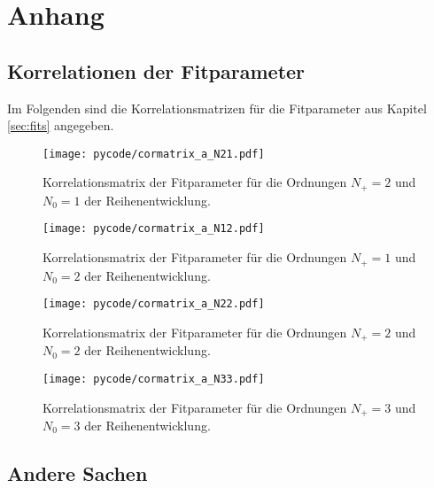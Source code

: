 \chapter{Anhang}

\section{Korrelationen der Fitparameter}
Im Folgenden sind die Korrelationsmatrizen für die Fitparameter aus Kapitel \ref{sec:fits} angegeben.
\begin{figure}
  \centering
  \texttt{[image: pycode/cormatrix\_a\_N21.pdf]}
  \caption{Korrelationsmatrix der Fitparameter für die Ordnungen $N_+ = \num{2}$ und $N_0 = \num{1}$ der Reihenentwicklung.}
  \label{fig:fitcor21}
\end{figure}

\begin{figure}
  \centering
  \texttt{[image: pycode/cormatrix\_a\_N12.pdf]}
  \caption{Korrelationsmatrix der Fitparameter für die Ordnungen $N_+ = \num{1}$ und $N_0 = \num{2}$ der Reihenentwicklung.}
  \label{fig:fitcor12}
\end{figure}

\begin{figure}
  \centering
  \texttt{[image: pycode/cormatrix\_a\_N22.pdf]}
  \caption{Korrelationsmatrix der Fitparameter für die Ordnungen $N_+ = \num{2}$ und $N_0 = \num{2}$ der Reihenentwicklung.}
  \label{fig:fitcor22}
\end{figure}

\begin{figure}
  \centering
  \texttt{[image: pycode/cormatrix\_a\_N33.pdf]}
  \caption{Korrelationsmatrix der Fitparameter für die Ordnungen $N_+ = \num{3}$ und $N_0 = \num{3}$ der Reihenentwicklung.}
  \label{fig:fitcor33}
\end{figure}

\section{Andere Sachen}

\nocite{tikzfeynman}


